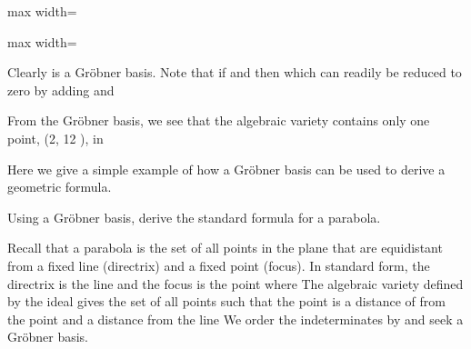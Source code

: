 \documentclass[11pt,oneside]{article}
\begin{document}
\begin{BookBody}
\begin{center}\begin{adjustbox}{max width=\linewidth}\end{adjustbox}\end{center}

\begin{center}\begin{adjustbox}{max width=\linewidth}\end{adjustbox}\end{center}

\noindent Clearly is a Gröbner basis. Note that if  and  then  which can readily be reduced to zero by adding  and 

From the Gröbner basis, we see that the algebraic variety  contains only one point, (2, 12 ), in \BookEnd{\blacktriangle}


\noindent Here we give a simple example of how a Gröbner basis can be used to derive a geometric formula.

 Using a Gröbner basis, derive the standard formula for a parabola.

 Recall that a parabola is the set of all points in the plane that are equidistant from a fixed line (directrix) and a fixed point (focus). In standard form, the directrix is the line  and the focus is the point  where  The algebraic variety defined by the ideal  gives the set of all points  
such that the point  is a distance of  from the point  and a distance  from the line  We order the indeterminates by  and seek a Gröbner basis.

\end{BookBody}
\end{document}
